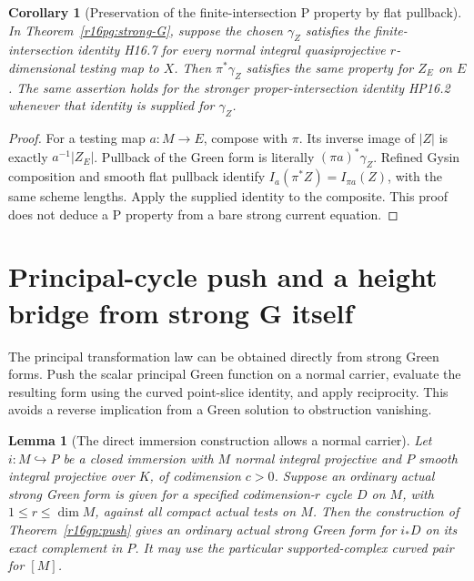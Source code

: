 \documentclass[11pt,a4paper]{article}
\newtheorem{lemma}[theorem]{Lemma}
\newtheorem{corollary}[theorem]{Corollary}
\theoremstyle{definition}
\theoremstyle{remark}
\numberwithin{equation}{section}
\begin{document}
\begin{corollary}[Preservation of the finite-intersection P property by flat pullback]
\label{r16pg:P}
In Theorem~\ref{r16pg:strong-G}, suppose the chosen $\gamma_Z$
satisfies the finite-intersection identity H16.7 for every normal
integral quasiprojective $r$-dimensional testing map to $X$.
Then $\pi^*\gamma_Z$ satisfies the same property for $Z_E$ on $E$.
The same assertion holds for the stronger proper-intersection
identity HP16.2 whenever that identity is supplied for $\gamma_Z$.
\end{corollary}

\begin{proof}
For a testing map $a:M\to E$, compose with $\pi$. Its inverse
image of $|Z|$ is exactly $a^{-1}|Z_E|$. Pullback of the Green
form is literally $(\pi a)^*\gamma_Z$. Refined Gysin composition
and smooth flat pullback identify
$I_a(\pi^*Z)=I_{\pi a}(Z)$, with the same scheme lengths. Apply
the supplied identity to the composite. This proof does not
deduce a P property from a bare strong current equation.
\end{proof}




\section{Principal-cycle push and a height bridge from strong G itself}
\label{r16ph:section}

The principal transformation law can be obtained directly from strong Green forms. Push the scalar principal Green function on a normal carrier, evaluate the resulting form using the curved point-slice identity, and apply reciprocity. This avoids a reverse implication from a Green solution to obstruction vanishing.

\begin{lemma}[The direct immersion construction allows a normal carrier]
\label{r16ph:normal-immersion}
Let $i:M\hookrightarrow P$ be a closed immersion with $M$ normal
integral projective and $P$ smooth integral projective over $K$, of
codimension $c>0$.  Suppose an ordinary actual strong Green form is
given for a specified codimension-$r$ cycle $D$ on $M$, with
$1\le r\le\dim M$, against all compact actual tests on $M$.
Then the construction of Theorem~\ref{r16gp:push} gives an ordinary
actual strong Green form for $i_*D$ on its exact complement in $P$.
It may use the particular supported-complex curved pair for $[M]$.
\end{lemma}
\end{document}
